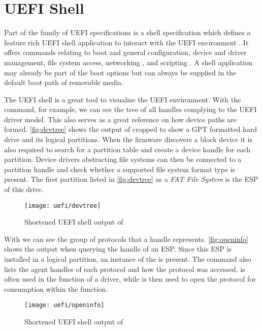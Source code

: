 
\section{\acs{UEFI} Shell}

Part of the family of \ac{UEFI} specifications is a shell specification which defines a feature rich \ac{UEFI} shell application to interact with the \ac{UEFI} environment \cite[Section 1.1]{uefi-shell-spec}.
It offers commands relating to boot and general configuration, device and driver management, file system access, networking \cite[Section 5.1]{uefi-shell-spec}, and scripting \cite[Section 4]{uefi-shell-spec}.
A shell application may already be part of the boot options but can always be supplied in the default boot path of removable media.

The \ac{UEFI} shell is a great tool to visualize the \ac{UEFI} environment.
With the  command, for example, we can see the tree of all handles complying to the \ac{UEFI} driver model.
This also serves as a great reference on how device paths are formed.
\autoref{fig:devtree} shows the output of  cropped to show a \ac{GPT} formatted hard drive and its logical partitions.
When the firmware discovers a block device it is also required to search for a partition table and create a device handle for each partition.
Device drivers abstracting file systems can then be connected to a partition handle and check whether a supported file system format type is present.
The first partition listed in \autoref{fig:devtree} as a \emph{FAT File System} is the \ac{ESP} of this drive.

\begin{figure}[htb]
    \centering
    \texttt{[image: uefi/devtree]}
    \caption{Shortened \ac{UEFI} shell output of }
    \label{fig:devtree}
\end{figure}

With  we can see the group of protocols that a handle represents.
\autoref{fig:openinfo} shows the output when querying the handle of an \ac{ESP}.
Since this \ac{ESP} is installed in a logical partition, an instance of the  is present.
The command also lists the agent handles of each protocol and how the protocol was accessed.
 is often used in the  function of a driver, while  is then used to open the protocol for consumption within the  function.

\begin{figure}[htb]
    \centering
    \texttt{[image: uefi/openinfo]}
    \caption{Shortened \ac{UEFI} shell output of }
    \label{fig:openinfo}
\end{figure}